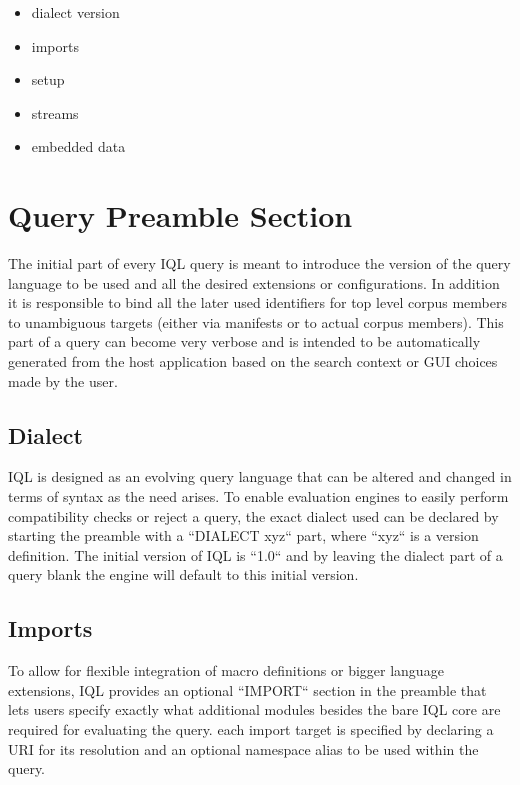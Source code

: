 \documentclass[11pt]{article}
\begin{document}
\begin{itemize}
	\item dialect version
	\item imports
	\item setup
	\item streams
	\item embedded data
\end{itemize}

\section{Query Preamble Section}
\label{sec:query-preamble}

The initial part of every IQL query is meant to introduce the version of the query language to be used and all the desired extensions or configurations. In addition it is responsible to bind all the later used identifiers for top level corpus members to unambiguous targets (either via manifests or to actual corpus members). This part of a query can become very verbose and is intended to be automatically generated from the host application based on the search context or GUI choices made by the user.

\subsection{Dialect}
\label{sec:dialect}

IQL is designed as an evolving query language that can be altered and changed in terms of syntax as the need arises. To enable evaluation engines to easily perform compatibility checks or reject a query, the exact dialect used can be declared by starting the preamble with a ``DIALECT xyz`` part, where ``xyz`` is a version definition.
The initial version of IQL is ``1.0`` and by leaving the dialect part of a query blank the engine will default to this initial version.

\subsection{Imports}
\label{sec:imports}

To allow for flexible integration of macro definitions or bigger language extensions, IQL provides an optional ``IMPORT`` section in the preamble that lets users specify exactly what additional modules besides the bare IQL core are required for evaluating the query. each import target is specified by declaring a URI for its resolution and an optional namespace alias to be used within the query.
\end{document}
